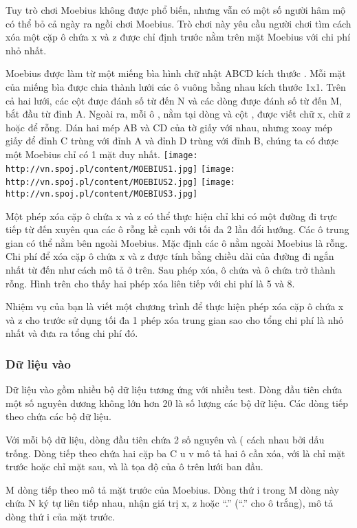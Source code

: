 



   Tuy trò chơi Moebius không được phổ biến, nhưng vẫn có một số người hâm mộ có thể bỏ cả ngày ra ngồi chơi Moebius. Trò chơi này yêu cầu người chơi tìm cách xóa một cặp ô chứa x và z được chỉ định trước nằm trên mặt Moebius với chi phí nhỏ nhất.  

   Moebius được làm từ một miếng bìa hình chữ nhật ABCD kích thước  . Mỗi mặt của miếng bìa được chia thành lưới các ô vuông bằng nhau kích thước 1x1. Trên cả hai lưới, các cột được đánh số từ   đến N và các dòng được đánh số từ   đến M, bắt đầu từ đỉnh A. Ngoài ra, mỗi ô  , nằm tại dòng   và cột  , được viết chữ x, chữ z hoặc để rỗng. Dán hai mép AB và CD của tờ giấy với nhau, nhưng xoay mép giấy để đỉnh C trùng với đỉnh A và đỉnh D trùng với đỉnh B, chúng ta có được một Moebius chỉ có 1 mặt duy nhất.  
\texttt{[image: http://vn.spoj.pl/content/MOEBIUS1.jpg]}
\texttt{[image: http://vn.spoj.pl/content/MOEBIUS2.jpg]}
\texttt{[image: http://vn.spoj.pl/content/MOEBIUS3.jpg]}

   Một phép xóa cặp ô chứa x và z có thể thực hiện chỉ khi có một đường đi trực tiếp từ   đến   xuyên qua các ô rỗng kề cạnh với tối đa 2 lần đổi hướng. Các ô trung gian có thể nằm bên ngoài Moebius. Mặc định các ô nằm ngoài Moebius là rỗng. Chi phí để xóa cặp ô chứa x và z được tính bằng chiều dài của đường đi ngắn nhất từ   đến   như cách mô tả ở trên. Sau phép xóa, ô chứa   và ô chứa   trở thành rỗng. Hình trên cho thấy hai phép xóa liên tiếp với chi phí là 5 và 8.  

   Nhiệm vụ của bạn là viết một chương trình để thực hiện phép xóa cặp ô chứa x và z cho trước sử dụng tối đa 1 phép xóa trung gian sao cho tổng chi phí là nhỏ nhất và đưa ra tổng chi phí đó.  

\subsubsection{   Dữ liệu vào  }

   Dữ liệu vào gồm nhiều bộ dữ liệu tương ứng với nhiều test. Dòng đầu tiên chứa một số nguyên dương không lớn hơn 20 là số lượng các bộ dữ liệu. Các dòng tiếp theo chứa các bộ dữ liệu.  

   Với mỗi bộ dữ liệu, dòng đầu tiên chứa 2 số nguyên   và   (  cách nhau bởi dấu trống. Dòng tiếp theo chứa hai cặp ba C u v mô tả hai ô cần xóa, với   là   chỉ mặt trước hoặc   chỉ mặt sau,    và    là tọa độ của ô trên lưới ban đầu.  

   M dòng tiếp theo mô tả mặt trước của Moebius. Dòng thứ i trong M dòng này chứa N ký tự liên tiếp nhau, nhận giá trị x, z hoặc “.” (“.” cho ô trắng), mô tả dòng thứ i của mặt trước.  

